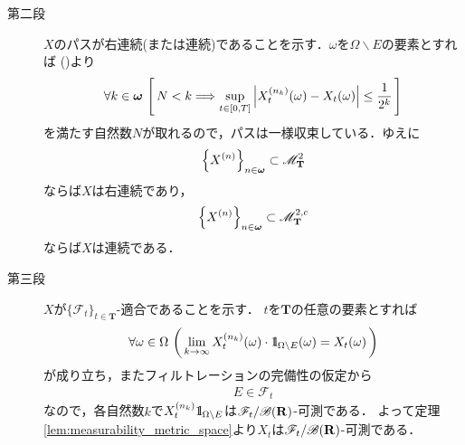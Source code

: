 \begin{sketch}
\begin{description}
			\item[第二段]
				$X$のパスが右連続(または連続)であることを示す．$\omega$を$\Omega \backslash E$の要素とすれば
				()より
				\begin{align}
					\forall k \in {\boldsymbol \omega}\,
					\left[\, N < k \Longrightarrow \operatorname*{sup}_{t \in [0,T]} \left|X_t^{(n_k)}(\omega) - X_t(\omega)\right| \leq \frac{1}{2^k}\, \right]
				\end{align}
				を満たす自然数$N$が取れるので，パスは一様収束している．ゆえに
				\begin{align}
					\left\{X^{(n)}\right\}_{n \in {\boldsymbol \omega}} \subset \mathscr{M}^2_{\mathbf{T}}
				\end{align}
				ならば$X$は右連続であり，
				\begin{align}
					\left\{X^{(n)}\right\}_{n \in {\boldsymbol \omega}} \subset \mathscr{M}^{2,c}_{\mathbf{T}}
				\end{align}
				ならば$X$は連続である．
			
			\item[第三段]
				$X$が$\{\mathscr{F}_t\}_{t \in \mathbf{T}}$-適合であることを示す．
				$t$を$\mathbf{T}$の任意の要素とすれば
				\begin{align}
					\forall \omega \in \Omega\, \left(\, 
					\lim_{k \to \infty} X_t^{(n_k)}(\omega) \cdot \mbox{1}\hspace{-0.25em}\mbox{l}_{\Omega \backslash E}(\omega) = X_t(\omega)\, \right)
				\end{align}
				が成り立ち，またフィルトレーションの完備性の仮定から
				\begin{align}
					E \in \mathscr{F}_t
				\end{align}
				なので，各自然数$k$で$X_t^{(n_k)} \mbox{1}\hspace{-0.25em}\mbox{l}_{\Omega \backslash E}$は$\mathscr{F}_t/\mathscr{B}(\mathbf{R})$-可測である．
				よって定理\ref{lem:measurability_metric_space}より$X_t$は$\mathscr{F}_t/\mathscr{B}(\mathbf{R})$-可測である．
				

\end{description}
\end{sketch}
